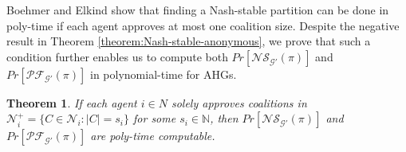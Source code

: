 \documentclass[letterpaper]{article}
\newtheorem{theorem}{Theorem}
\begin{document}
Boehmer and Elkind  show that finding a Nash-stable partition can be done in poly-time if each agent approves at most one coalition size. Despite the negative result in Theorem \ref{theorem:Nash-stable-anonymous}, we prove that such a condition further enables us to compute both $Pr[\mathcal{NS}_{\mathcal{G}'}(\pi)]$ and $Pr[\mathcal{PF}_{\mathcal{G}'}(\pi)]$ in polynomial-time for AHGs.
\begin{theorem}
\label{theorem:nash-at most one coalition size}
If each agent $i \in N$ solely approves coalitions in $\mathcal{N}_i^+ = \{C \in \mathcal{N}_i : |C| = s_i\}$ for some $s_i \in \mathbb{N}$, then $Pr[\mathcal{NS}_{\mathcal{G}'}(\pi)]$ and $Pr[\mathcal{PF}_{\mathcal{G}'}(\pi)]$ are poly-time computable.
\end{theorem}
\end{document}
